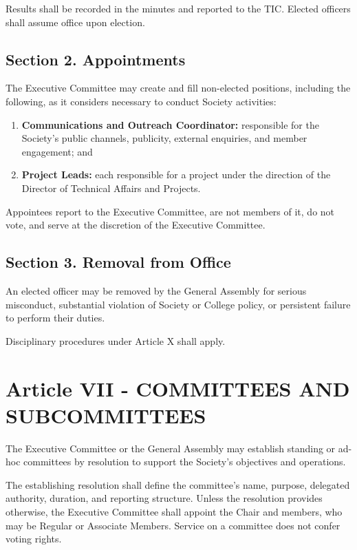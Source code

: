 \documentclass[a4paper]{article}
\begin{document}
Results shall be recorded in the minutes and reported to the TIC. Elected officers shall
assume office upon election.

\subsection*{Section 2. Appointments}
The Executive Committee may create and fill non-elected positions, including the
following, as it considers necessary to conduct Society activities:

\begin{enumerate}
    \item \textbf{Communications and Outreach Coordinator:} responsible for the
    Society's public channels, publicity, external enquiries, and member engagement; and
    \item \textbf{Project Leads:} each responsible for a project under the direction of
    the Director of Technical Affairs and Projects.
\end{enumerate}

Appointees report to the Executive Committee, are not members of it, do not vote, and serve at the discretion of the Executive Committee.

\subsection*{Section 3. Removal from Office}
An elected officer may be removed by the General Assembly for serious misconduct,
substantial violation of Society or College policy, or persistent failure to perform
their duties.

Disciplinary procedures under Article X shall apply.

\section*{Article VII - COMMITTEES AND SUBCOMMITTEES}

The Executive Committee or the General Assembly may establish standing or ad-hoc committees by resolution
to support the Society's objectives and operations.

The establishing resolution shall define the committee's name, purpose, delegated
authority, duration, and reporting structure. Unless the resolution provides otherwise,
the Executive Committee shall appoint the Chair and members, who may be Regular or
Associate Members. Service on a committee does not confer voting rights.
\end{document}
